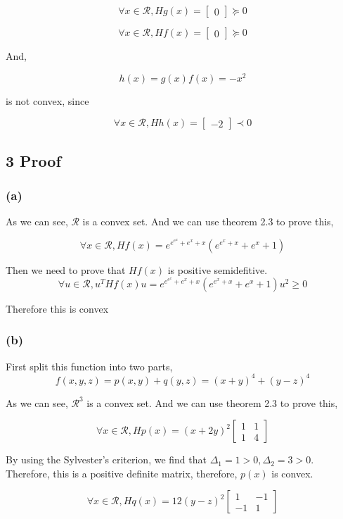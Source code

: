 \documentclass{article}
\begin{document}
$$\forall x \in \mathcal{R}, Hg(x)= \begin{bmatrix} 0\end{bmatrix} \succeq 0$$

$$\forall x \in \mathcal{R}, Hf(x)= \begin{bmatrix} 0\end{bmatrix} \succeq 0$$

And,

$$h(x) = g(x)f(x) = -x^2$$

is not convex, since

$$\forall x \in \mathcal{R}, Hh(x)= \begin{bmatrix} -2\end{bmatrix} \prec 0$$

\subsection*{3 Proof}
\subsubsection*{(a)}
As we can see, $\mathcal{R}$ is a convex set. And we can use theorem 2.3 to prove this,

$$\forall x \in \mathcal{R}, Hf(x) = e^{e^{e^x}+e^x+x}\left(e^{e^x+x}+e^x+1\right)$$

Then we need to prove that $Hf(x)$ is positive semidefitive.
$$\forall u \in \mathcal{R}, u^THf(x)u = e^{e^{e^x}+e^x+x}\left(e^{e^x+x}+e^x+1\right) u^2 \ge 0$$

Therefore this is convex

\subsubsection*{(b)}
First split this function into two parts,
$$f(x, y, z) = p(x, y) + q(y, z) = (x + y)^4 + (y-z)^4$$

As we can see, $\mathcal{R}^3$ is a convex set. And we can use theorem 2.3 to prove this,

$$\forall x \in \mathcal{R}, Hp(x) = (x+2y)^2\begin{bmatrix} 1&1 \\ 1 & 4 \end{bmatrix}$$

By using the Sylvester's criterion, we find that $\Delta_1 = 1 > 0, \Delta_2 = 3 > 0$. Therefore, this is a positive definite matrix, therefore, $p(x)$ is convex.

$$\forall x \in \mathcal{R}, Hq(x) = 12(y-z)^2\begin{bmatrix} 1&-1 \\ -1 & 1 \end{bmatrix}$$
\end{document}
